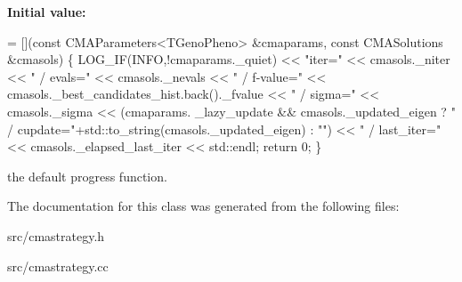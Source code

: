 {\bfseries Initial value\-:}
\begin{DoxyCode}
= [](\textcolor{keyword}{const} CMAParameters<TGenoPheno> &cmaparams, \textcolor{keyword}{const} CMASolutions &cmasols)
  \{
    LOG\_IF(INFO,!cmaparams.\_quiet) << \textcolor{stringliteral}{"iter="} << cmasols.\_niter << \textcolor{stringliteral}{" / evals="} << cmasols.\_nevals << \textcolor{stringliteral}{" /
       f-value="} << cmasols.\_best\_candidates\_hist.back().\_fvalue <<  \textcolor{stringliteral}{" / sigma="} << cmasols.\_sigma << (cmaparams.
      \_lazy\_update && cmasols.\_updated\_eigen ? \textcolor{stringliteral}{" / cupdate="}+std::to\_string(cmasols.\_updated\_eigen) : \textcolor{stringliteral}{""}) << \textcolor{stringliteral}{" /
       last\_iter="} << cmasols.\_elapsed\_last\_iter << std::endl;
    \textcolor{keywordflow}{return} 0;
  \}
\end{DoxyCode}
the default progress function. 

The documentation for this class was generated from the following files\-:\begin{DoxyCompactItemize}
\item 
src/cmastrategy.\-h\item 
src/cmastrategy.\-cc\end{DoxyCompactItemize}

